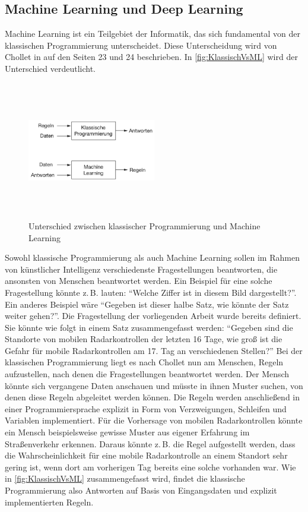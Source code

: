 \subsection{Machine Learning und Deep Learning}
\label{sec:MachineDeepLearning}

Machine Learning ist ein Teilgebiet der Informatik, das sich fundamental von der klassischen Programmierung unterscheidet.
Diese Unterscheidung wird von Chollet in \cite{DeepLearningPythonKeras} auf den Seiten 23 und 24 beschrieben.
In \autoref{fig:KlassischVsML} wird der Unterschied verdeutlicht.

\begin{figure}[h]
    \centering
    \includegraphics[width=0.5\textwidth,height=6cm,keepaspectratio=true]{content/images/KlassischVsML.png}
    \caption{Unterschied zwischen klassischer Programmierung und Machine Learning \cite[Abb.~1.2]{DeepLearningPythonKeras}}
    \label{fig:KlassischVsML}
\end{figure}

Sowohl klassische Programmierung als auch Machine Learning sollen im Rahmen von künstlicher Intelligenz verschiedenste Fragestellungen beantworten, die ansonsten von Menschen beantwortet werden.
Ein Beispiel für eine solche Fragestellung könnte z.\,B. lauten: "`Welche Ziffer ist in diesem Bild dargestellt?"'.
Ein anderes Beispiel wäre "`Gegeben ist dieser halbe Satz, wie könnte der Satz weiter gehen?"'.
Die Fragestellung der vorliegenden Arbeit wurde bereits definiert.
Sie könnte wie folgt in einem Satz zusammengefasst werden:
"`Gegeben sind die Standorte von mobilen Radarkontrollen der letzten 16 Tage, wie groß ist die Gefahr für mobile Radarkontrollen am 17. Tag an verschiedenen Stellen?"'
Bei der klassischen Programmierung liegt es nach Chollet nun am Menschen, Regeln aufzustellen, nach denen die Fragestellungen beantwortet werden.
Der Mensch könnte sich vergangene Daten anschauen und müsste in ihnen Muster suchen, von denen diese Regeln abgeleitet werden können.
Die Regeln werden anschließend in einer Programmiersprache explizit in Form von Verzweigungen, Schleifen und Variablen implementiert.
Für die Vorhersage von mobilen Radarkontrollen könnte ein Mensch beispielsweise gewisse Muster aus eigener Erfahrung im Straßenverkehr erkennen.
Daraus könnte z.\,B. die Regel aufgestellt werden, dass die Wahrscheinlichkeit für eine mobile Radarkontrolle an einem Standort sehr gering ist, wenn dort am vorherigen Tag bereits eine solche vorhanden war.
Wie in \autoref{fig:KlassischVsML} zusammengefasst wird, findet die klassische Programmierung also Antworten auf Basis von Eingangsdaten und explizit implementierten Regeln.

